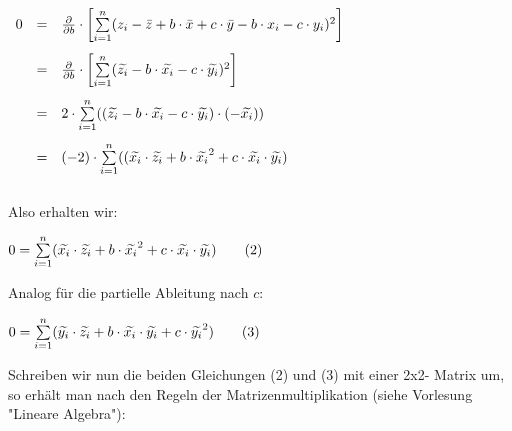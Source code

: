 \documentclass[12pt]{article}
\begin{document}
\begin{large} 
\hspace*{1.3cm}
$
\begin{array}[t]{lcl}
 0 & = & 
 \frac{\partial}{\partial b} \cdot \left[ \sum\limits_{i=1}^n (z_i - \bar{z} + b \cdot \bar{x} + c \cdot \bar{y} - b \cdot x_i -c \cdot y_i)^2 \right] \\[0.5cm]
& = &  \frac{\partial}{\partial b} \cdot \left[ \sum\limits_{i=1}^n (\widetilde{z_i} - b \cdot \widetilde{x_i} - c \cdot \widetilde{y_i})^2 \right] \ \\[0.5cm]
& = &
2 \cdot \sum\limits_{i=1}^n ((\widetilde{z_i} - b \cdot \widetilde{x_i} - c \cdot \widetilde{y_i}) \cdot (-\widetilde{x_i})) \ \\[0.5cm] 
& = &
(-2) \cdot \sum\limits_{i=1}^n ((\widetilde{x_i} \cdot \widetilde{z_i} + b \cdot \widetilde{x_i}^2 + c \cdot \widetilde{x_i} \cdot \widetilde{y_i}) \ \\[0.5cm] 
\end{array} \\[0.3cm] 
$
\end{large}
Also erhalten wir:\\[0.5cm] 
\begin{Large} 
\hspace*{3.5cm} 
$ 0 = \sum\limits_{i=1}^n (\widetilde{x_i} \cdot \widetilde{z_i} + b \cdot \widetilde{x_i}^2 + c \cdot \widetilde{x_i} \cdot \widetilde{y_i}) \qquad (2)\\[0.3cm]$   
\end{Large}
Analog für die partielle Ableitung nach $c$: \\[0.4cm] 
\begin{Large} 
\hspace*{3.5cm} 
$ 0 = \sum\limits_{i=1}^n (\widetilde{y_i} \cdot \widetilde{z_i} + b \cdot \widetilde{x_i} \cdot \widetilde{y_i} + c \cdot \widetilde{y_i}^2) \qquad (3)\\[0.6cm]$ 
\end{Large}
%
Schreiben wir nun die beiden Gleichungen (2) und (3) mit einer 2x2- Matrix um, so erhält man nach den Regeln der Matrizenmultiplikation (siehe Vorlesung "Lineare Algebra"):\\[0.4cm]  
\end{document}
